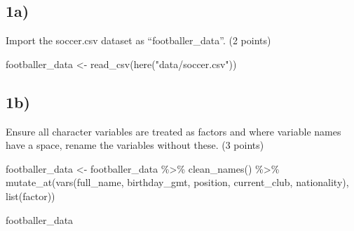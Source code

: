 \documentclass[
]{article}
\newenvironment{Shaded}{\begin{snugshade}}{\end{snugshade}}
\newcommand{\FunctionTok}[1]{\textcolor[rgb]{0.00,0.00,0.00}{#1}}
\newcommand{\NormalTok}[1]{#1}
\newcommand{\OtherTok}[1]{\textcolor[rgb]{0.56,0.35,0.01}{#1}}
\newcommand{\SpecialCharTok}[1]{\textcolor[rgb]{0.00,0.00,0.00}{#1}}
\newcommand{\StringTok}[1]{\textcolor[rgb]{0.31,0.60,0.02}{#1}}
\begin{document}
\hypertarget{a}{%
\subsection{1a)}\label{a}}

Import the soccer.csv dataset as ``footballer\_data''. (2 points)

\begin{Shaded}
\begin{Highlighting}[]
\NormalTok{footballer\_data }\OtherTok{\textless{}{-}} 
  \FunctionTok{read\_csv}\NormalTok{(}\FunctionTok{here}\NormalTok{(}\StringTok{"data/soccer.csv"}\NormalTok{))}
\end{Highlighting}
\end{Shaded}

\hypertarget{b}{%
\subsection{1b)}\label{b}}

Ensure all character variables are treated as factors and where variable
names have a space, rename the variables without these. (3 points)

\begin{Shaded}
\begin{Highlighting}[]
\NormalTok{footballer\_data }\OtherTok{\textless{}{-}}
\NormalTok{  footballer\_data }\SpecialCharTok{\%\textgreater{}\%}
  \FunctionTok{clean\_names}\NormalTok{() }\SpecialCharTok{\%\textgreater{}\%}
  \FunctionTok{mutate\_at}\NormalTok{(}\FunctionTok{vars}\NormalTok{(full\_name, birthday\_gmt, position, current\_club, nationality),}
            \FunctionTok{list}\NormalTok{(factor))}

\NormalTok{footballer\_data}
\end{Highlighting}
\end{Shaded}
\end{document}
